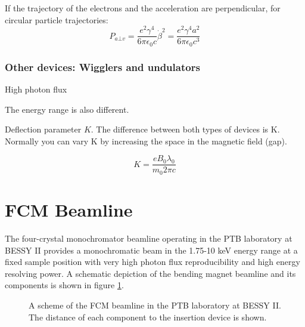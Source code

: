 If the trajectory of the electrons and the acceleration are perpendicular, for circular particle trajectories:
\begin{equation}
        P_{a \bot v}=\frac{e^2\gamma^4}{6\pi\epsilon_0c}\dot{\beta}^2=\frac{e^2\gamma^4a^2}{6\pi\epsilon_0c^3}
\end{equation}

\subsubsection{Other devices: Wigglers and undulators}

 High photon flux
 
The energy range is also different.

Deflection parameter $K$. The difference between both types of devices is K. Normally you can vary K by increasing the space in the magnetic field (gap).

\begin{equation}
        K=\frac{eB_0\lambda_0}{m_0 2\pi c}
\end{equation}


\section{FCM Beamline}
\label{sec:fcm}

The four-crystal monochromator beamline operating in the PTB laboratory at BESSY II \citep{krumrey_design_1998, krumrey_high-accuracy_2001} provides a monochromatic beam in the 1.75-10 keV energy range at a fixed sample position with very high photon flux reproducibility and high energy resolving power. A schematic depiction of the bending magnet beamline and its components is shown in figure \ref{fig:FCMScheme}.

\begin{figure}%
	\centering
		\caption{A scheme of the FCM beamline in the PTB laboratory at BESSY II. The distance of each component to the insertion device is shown.}
		\label{fig:FCMScheme}
\end{figure}

